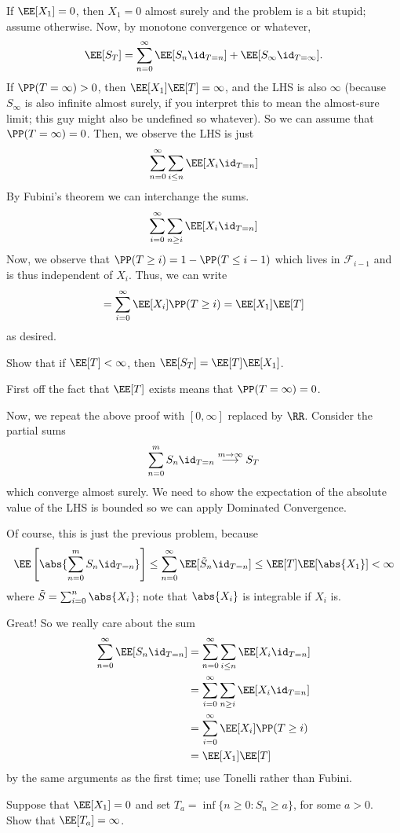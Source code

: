 \documentclass[11pt, headheight=30pt]{scrartcl}
\begin{document}
If $\EE[X_1] = 0$, then $X_1 = 0$ almost surely and the problem is a bit stupid;
assume otherwise. Now, by monotone convergence or whatever,
\[
    \EE[S_T] = \sum_{n = 0}^\infty \EE[S_n \id_{T = n}] + \EE[S_\infty \id_{T = \infty}].
\]
If $\PP(T = \infty) > 0$, then $\EE[X_1]\EE[T] = \infty$, and the LHS is also $\infty$
(because $S_\infty$ is also infinite almost surely, if you interpret this to mean
the almost-sure limit; this guy might also be undefined so whatever). So we can assume
that $\PP(T = \infty) = 0$. Then, we observe the LHS is just
\[
    \sum_{n = 0}^\infty \sum_{i\leq n} \EE[X_i\id_{T = n}]
\]
By Fubini's theorem we can interchange the sums.
\[
    \sum_{i = 0}^\infty \sum_{n\geq i} \EE[X_i\id_{T = n}]
\]
Now, we observe that $\PP(T \geq i) = 1 - \PP(T \leq i - 1)$ which lives in $\mathscr{F}_{i-1}$
and is thus independent of $X_i$. Thus, we can write
\[
    = \sum_{i = 0}^\infty \EE[X_i]\PP(T \geq i) = \EE[X_1]\EE[T]
\]
as desired.

\begin{prob}
    Show that if $\EE[T] < \infty$, then
    $\EE[S_T] = \EE[T]\EE[X_1]$.
\end{prob}

First off the fact that $\EE[T]$ exists means that $\PP(T = \infty) = 0$.

Now, we repeat the above proof with $[0, \infty]$ replaced by $\RR$.
Consider the partial sums
\[
    \sum_{n = 0}^m S_n\id_{T = n} \stackrel{m\to \infty}{\longrightarrow} S_T   
\]
which converge almost surely. We need to show the expectation of the absolute
value of the LHS is bounded so we can apply Dominated Convergence.

Of course, this is just the previous problem, because
\[
    \EE\left[\abs{\sum_{n = 0}^m S_n\id_{T = n}}\right]\leq \sum_{n = 0}^\infty \EE[\tilde{S}_n\id_{T = n}]\leq \EE[T] \EE[\abs{X_1}] < \infty
\]
where $\tilde{S} = \sum_{i = 0}^n \abs{X_i}$; note that $\abs{X_i}$ is integrable if $X_i$
is.

Great! So we really care about the sum
\begin{align*}
    \sum_{n = 0}^\infty \EE[S_n\id_{T = n}]
    &= \sum_{n = 0}^\infty \sum_{i\leq n} \EE[X_i\id_{T = n}]\\
    &= \sum_{i = 0}^\infty \sum_{n\geq i} \EE[X_i\id_{T = n}]\\
    &= \sum_{i = 0}^\infty \EE[X_i]\PP(T \geq i)\\
    &= \EE[X_1]\EE[T]
\end{align*}
by the same arguments as the first time; use Tonelli rather than Fubini.
\begin{prob}
    Suppose that $\EE[X_1] = 0$ and set $T_a = \inf\{n \geq 0 : S_n \geq a\}$, for some $a > 0$. Show that
    $\EE[T_a] = \infty$.
\end{prob}
\end{document}

